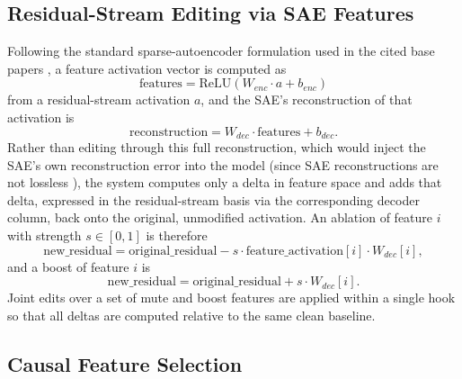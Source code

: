 \documentclass[conference]{IEEEtran}
\begin{document}
\subsection{Residual-Stream Editing via SAE Features}

Following the standard sparse-autoencoder formulation used in the cited base papers \cite{cunningham2023sparse, bricken2023towards}, a feature activation vector is computed as
\begin{equation}
\text{features} = \text{ReLU}(W_{enc} \cdot a + b_{enc})
\end{equation}
from a residual-stream activation $a$, and the SAE's reconstruction of that activation is
\begin{equation}
\text{reconstruction} = W_{dec} \cdot \text{features} + b_{dec}.
\end{equation}
Rather than editing through this full reconstruction, which would inject the SAE's own reconstruction error into the model (since SAE reconstructions are not lossless \cite{cunningham2023sparse, bricken2023towards}), the system computes only a delta in feature space and adds that delta, expressed in the residual-stream basis via the corresponding decoder column, back onto the original, unmodified activation. An ablation of feature $i$ with strength $s \in [0,1]$ is therefore
\begin{equation}
\text{new\_residual} = \text{original\_residual} - s \cdot \text{feature\_activation}[i] \cdot W_{dec}[i],
\end{equation}
and a boost of feature $i$ is
\begin{equation}
\text{new\_residual} = \text{original\_residual} + s \cdot W_{dec}[i].
\end{equation}
Joint edits over a set of mute and boost features are applied within a single hook so that all deltas are computed relative to the same clean baseline.

\subsection{Causal Feature Selection}
\end{document}
